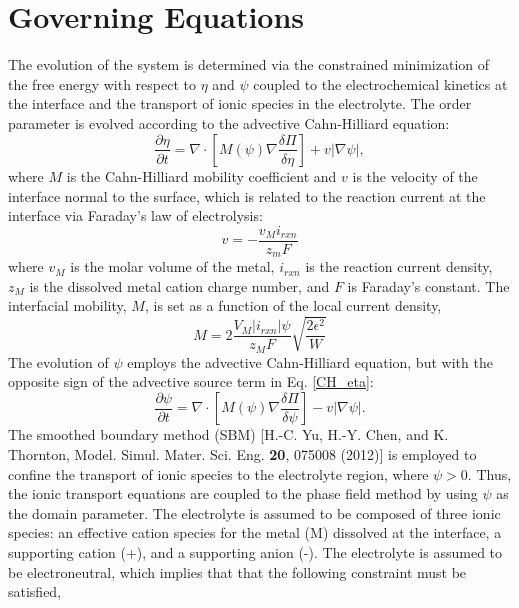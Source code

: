 \documentclass[10pt]{article}
\begin{document}
\section{Governing Equations}
The evolution of the system is determined via the constrained minimization of the free energy with respect to $\eta$  and  $\psi$ coupled to the electrochemical kinetics at the interface and the transport of ionic species in the electrolyte. The order parameter is evolved according to the advective Cahn-Hilliard equation:
\begin{equation}
\label{CH_eta}
 \frac{\partial \eta}{\partial t} = \nabla \cdot \left[ M(\psi) \nabla \frac{\delta \Pi}{\delta \eta}\right] + v |\nabla \psi|,
 \end{equation}
\noindent where $M$ is the Cahn-Hilliard mobility coefficient and $v$ is the velocity of the interface normal to the surface, which is related to the reaction current at the interface via Faraday's law of electrolysis:
\begin{equation}
\label{int_vel}
v=-\frac{v_M i_{rxn}}{z_m F}
 \end{equation}
\noindent where $v_M$ is the molar volume of the metal, $i_{rxn}$ is the reaction current density, $z_M$ is the dissolved metal cation charge number, and $F$ is Faraday's constant. The interfacial mobility, $M$, is set as a function of the local current density,
\begin{equation}
M=2\frac{V_M |i_{rxn}| \psi}{z_M F}\sqrt{\frac{2 \epsilon^2}{W}}
\end{equation}
The evolution of $\psi$ employs the advective Cahn-Hilliard equation, but with the opposite sign of the advective source term in Eq. \eqref{CH_eta}:
\begin{equation}
\label{CH_psi}
 \frac{\partial \psi}{\partial t} = \nabla \cdot \left[ M(\psi) \nabla \frac{\delta \Pi}{\delta \psi} \right] - v |\nabla \psi|.
 \end{equation}
 The smoothed boundary method (SBM)  [H.-C. Yu, H.-Y. Chen, and K. Thornton, Model. Simul. Mater. Sci. Eng. {\bf 20}, 075008
(2012)] is employed to confine the transport of ionic species to the electrolyte region, where $\psi > 0$. Thus, the ionic transport equations are coupled to the phase field method by using  $\psi$ as the domain parameter. The electrolyte is assumed to be composed of three ionic species: an effective cation species for the metal (M) dissolved at the interface, a supporting cation (+), and a supporting anion (-). The electrolyte is assumed to be electroneutral, which implies that that the following constraint must be satisfied,
\end{document}

